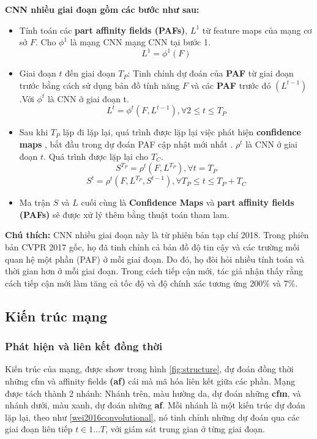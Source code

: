 \begin{itemize}
\textbf{CNN nhiều giai đoạn gồm các bước như sau:}
\begin{itemize}
\item Tính toán các \textbf{part affinity fields (PAFs)}, $ L^{1}$ từ feature maps của mạng cơ sở $F$. Cho $\phi^1$ là mạng CNN mạng CNN tại bước 1. 
$$L^1 = \phi^1(F) $$

\item Giai đoạn $t$ đến giai đoạn $T_P$: Tinh chỉnh dự đoán của \textbf{PAF} từ giai đoạn trước bằng cách sử dụng bản đồ tính năng $F$ và các \textbf{PAF} trước đó $(L^{t-1})$.Với $\phi^t$ là CNN ở giai đoạn t.
$$L^t = \phi^t(F, L^{t-1}), \forall 2 \leq t \leq T_P$$
\item Sau khi $T_P$ lặp đi lặp lại, quá trình được lặp lại việc phát hiện \textbf{confidence maps} , bắt đầu trong dự đoán PAF cập nhật mới nhất . $\rho^t$ là CNN ở giai đoạn $t$. Quá trình được lặp lại cho $T_C$.
$$S^{T_P} = \rho^t(F, L^{T_P}), \forall t = T_P$$
$$S^t = \rho^t(F, L^{T_P}, S^{t-1}), \forall T_P \leq t \leq T_P + T_C$$

\item Ma trận $S$ và $L$ cuối cùng là \textbf{Confidence Maps} và \textbf{part affinity fields (PAFs)} sẽ được xử lý thêm bằng thuật toán tham lam.

\end{itemize}
\end{itemize}
\textbf{Chú thích:}
CNN nhiều giai đoạn này là từ phiên bản tạp chí 2018. Trong phiên bản CVPR 2017 gốc, họ đã tinh chỉnh cả bản đồ độ tin cậy và các trường mối quan hệ một phần (PAF) ở mỗi giai đoạn. Do đó, họ đòi hỏi nhiều tính toán và thời gian hơn ở mỗi giai đoạn. Trong cách tiếp cận mới, tác giả nhận thấy rằng cách tiếp cận mới làm tăng cả tốc độ và độ chính xác tương ứng 200\% và 7\%.

\subsection{Kiến trúc mạng}
\label{sss:structure}
\subsubsection{Phát hiện và liên kết đồng thời}

Kiến trúc của mạng, được show trong hình \ref{fig:structure}, dự đoán đồng thời những cfm và affinity fields \textbf{(af)} cái mà mã hóa liên kết giữa các phần. Mạng được tách thành 2 nhánh: Nhánh trên, màu hường da, dự đoán những \textbf{cfm}, và nhánh dưới, màu xanh, dự đoán những \textbf{af}. Mỗi nhánh là một kiến trúc dự đoán lặp lại, theo như \ref{wei2016convolutional}, nó tinh chỉnh những dự đoán qua các giai đoạn liên tiếp $t \in {{1 \ldots T}}$,  với giám sát trung gian ở từng giai đoạn.

